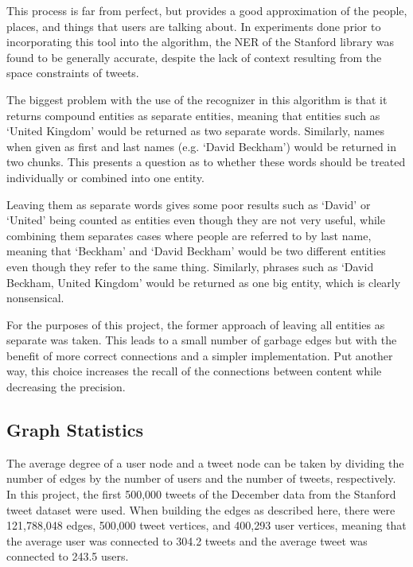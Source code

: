 This process is far from perfect, but provides a good approximation of the people, places, and things that users are talking about. In experiments done prior to incorporating this tool into the algorithm, the NER of the Stanford library was found to be generally accurate, despite the lack of context resulting from the space constraints of tweets.

The biggest problem with the use of the recognizer in this algorithm is that it returns compound entities as separate entities, meaning that entities such as `United Kingdom' would be returned as two separate words. Similarly, names when given as first and last names (e.g. `David Beckham') would be returned in two chunks. This presents a question as to whether these words should be treated individually or combined into one entity.

Leaving them as separate words gives some poor results such as `David' or `United' being counted as entities even though they are not very useful, while combining them separates cases where people are referred to by last name, meaning that `Beckham' and `David Beckham' would be two different entities even though they refer to the same thing. Similarly, phrases such as `David Beckham, United Kingdom' would be returned as one big entity, which is clearly nonsensical.

For the purposes of this project, the former approach of leaving all entities as separate was taken. This leads to a small number of garbage edges but with the benefit of more correct connections and a simpler implementation. Put another way, this choice increases the recall of the connections between content while decreasing the precision.


\subsection{Graph Statistics}

The average degree of a user node and a tweet node can be taken by dividing the number of edges by the number of users and the number of tweets, respectively. In this project, the first 500,000 tweets of the December data from the Stanford tweet dataset were used. When building the edges as described here, there were  121,788,048 edges, 500,000 tweet vertices, and 400,293 user vertices, meaning that the average user was connected to 304.2 tweets and the average tweet was connected to 243.5 users.

